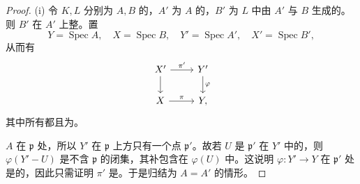 \begin{proof}
(i) 令 $K,L$ 分别为 $A,B$ 的，$A'$ 为 $A$ 的，$B'$ 为 $L$ 中由 $A'$ 与 $B$ 生成的。则 $B'$ 在 $A'$ 上整。置
\[
Y=\operatorname{Spec}A,\quad X=\operatorname{Spec}B,\quad
Y'=\operatorname{Spec}A',\quad X'=\operatorname{Spec}B',
\]
从而有
\[
\begin{tikzcd}
X'\arrow[r,"\pi'"]\arrow[d]&Y'\arrow[d,"\varphi"]\\
X\arrow[r,"\pi"]&Y,
\end{tikzcd}
\]
其中所有都且为。

$A$ 在 $\mathfrak p$ 处，所以 $Y'$ 在 $\mathfrak p$ 上方只有一个点 $\mathfrak p'$。故若 $U$ 是 $\mathfrak p'$ 在 $Y'$ 中的，则 $\varphi(Y'-U)$ 是不含 $\mathfrak p$ 的闭集，其补包含在 $\varphi(U)$ 中。这说明 $\varphi:Y'\to Y$ 在 $\mathfrak p'$ 处是的，因此只需证明 $\pi'$ 是。于是归结为 $A=A'$ 的情形。


\end{proof}
